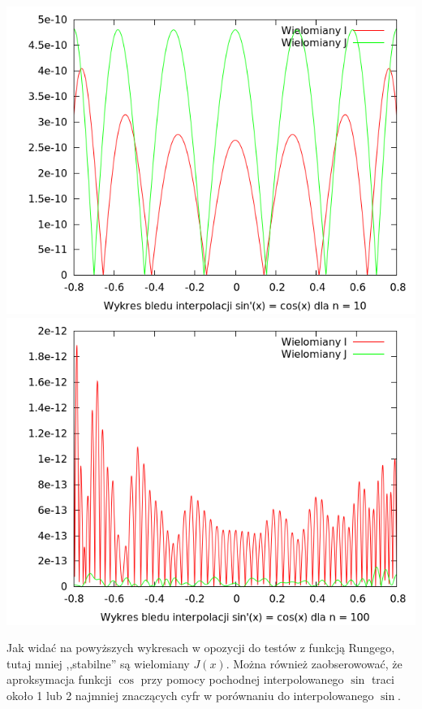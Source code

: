 \documentclass[11pt,leqno]{article}
\begin{document}
\begin{center}
\includegraphics[scale=0.65,natwidth=640,natheight=480]{plot/cos10e.png}\\
\includegraphics[scale=0.65,natwidth=640,natheight=480]{plot/cos100e.png}\\
\end{center}

Jak widać na powyższych wykresach w opozycji do testów z funkcją Rungego, tutaj mniej ,,stabilne'' są wielomiany $J(x)$. Można również zaobserowować, że aproksymacja funkcji $\cos$ przy pomocy pochodnej interpolowanego $\sin$ traci około 1 lub 2 najmniej znaczących cyfr w porównaniu do interpolowanego $\sin$.
\end{document}
